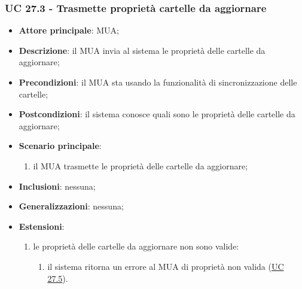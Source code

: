     \subsubsection{UC 27.3 - Trasmette proprietà cartelle da aggiornare} \label{sec:UC27.3}
    \begin{itemize}
        \item \textbf{Attore principale}: MUA;
        \item \textbf{Descrizione}: il MUA invia al sistema le proprietà delle cartelle da aggiornare;
        \item \textbf{Precondizioni}: il MUA sta usando la funzionalità di sincronizzazione delle cartelle;
        \item \textbf{Postcondizioni}: il sistema conosce quali sono le proprietà delle cartelle da aggiornare;
        \item \textbf{Scenario principale}:
            \begin{enumerate}
                \item il MUA trasmette le proprietà delle cartelle da aggiornare;
            \end{enumerate}
        \item \textbf{Inclusioni}: nessuna;
        \item \textbf{Generalizzazioni}: nessuna;
        \item \textbf{Estensioni}:
            \begin{enumerate}[label=\alph*.]
                \item le proprietà delle cartelle da aggiornare non sono valide:
                \begin{enumerate}[label=\arabic*.]
                    \item il sistema ritorna un errore al MUA di proprietà non valida (\hyperref[sec:UC27.5]{UC 27.5}).
                \end{enumerate}
            \end{enumerate}
    \end{itemize}


